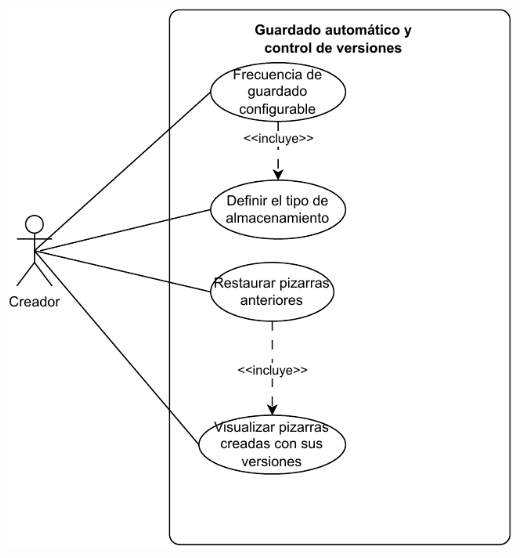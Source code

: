 \documentclass[a4paper, oneside, final]{scrartcl}
\begin{document}
\includegraphics[width=\textwidth]{images/Casos-de-uso-3.pdf}
\end{document}
